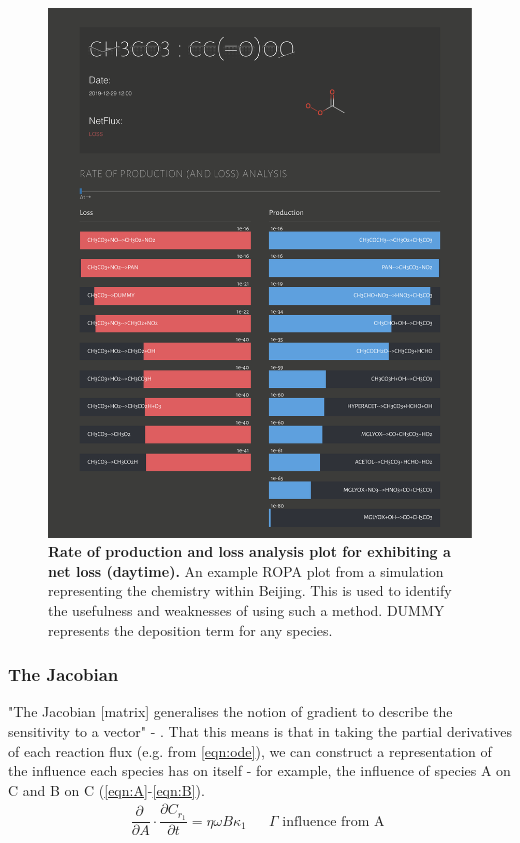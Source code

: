 \begin{figure}[H]
     \centering
         \includegraphics[width=\textwidth]{figures/ROPA_CH3CO3.pdf}
        \caption{\textbf{Rate of production and loss analysis plot for  exhibiting a net loss (daytime).} An example ROPA plot from a simulation representing the chemistry within Beijing. This is used to identify the usefulness and weaknesses of using such a method. DUMMY represents the deposition term for any species. }
        \label{fig:ropa_day}
\end{figure}
\newpage



\subsubsection{The Jacobian}
"The Jacobian [matrix] generalises the notion of gradient to describe the sensitivity to a vector" - \cite{jacob}. That this means is that in taking the partial derivatives of each reaction flux (e.g. from \autoref{eqn:ode}), we can construct a representation of the influence each species has on itself - for example, the influence of species A on C and B on C (\autoref{eqn:A}-\ref{eqn:B}). 
\begin{eqnarray}
   \dfrac{\partial \ }{\partial A}\cdot \dfrac{\partial C_{r_1}}{\partial t} = \eta \omega B \kappa_1 & & \Gamma \text{ influence from A }\label{eqn:A}%
\end{eqnarray}
    
